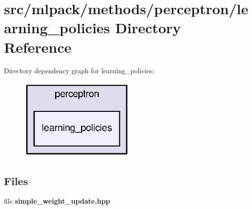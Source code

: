 \section{src/mlpack/methods/perceptron/learning\+\_\+policies Directory Reference}
\label{dir_6c1f83a8c807bd60aeee8e610fd4412e}
Directory dependency graph for learning\+\_\+policies\+:
\nopagebreak
\begin{figure}[H]
\begin{center}
\leavevmode
\includegraphics[width=164pt]{dir_6c1f83a8c807bd60aeee8e610fd4412e_dep}
\end{center}
\end{figure}
\subsection*{Files}
\begin{DoxyCompactItemize}
\item 
file {\bf simple\+\_\+weight\+\_\+update.\+hpp}
\end{DoxyCompactItemize}
